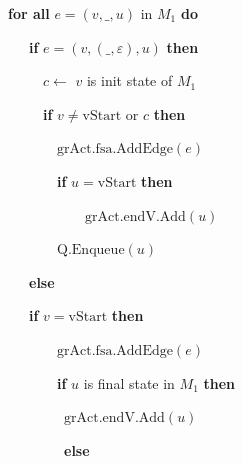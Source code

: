\begin{figure}[b]
\ \ \ \ \ \ \ \ \textbf{for all} {$e = (v, \_, u)$ in $M_1$ \textbf{do}}





\ \ \ \ \ \ \ \ \ \ \ \textbf{if} {$e = (v, (\_, \varepsilon), u)$} \textbf{then}





\ \ \ \ \ \ \ \ \ \ \ \ \ {$c \gets$  $v$ is init state of $M_1$}





\ \ \ \ \ \ \ \ \ \ \ \ \ \textbf{if} {$v \neq \mathrm{vStart}$ or $c$} \textbf{then}





\ \ \ \ \ \ \ \ \ \ \ \ \ \ \ {$\mathrm{grAct.fsa.AddEdge}(e)$}





\ \ \ \ \ \ \ \ \ \ \ \ \ \ \ \textbf{if} {$u = \mathrm{vStart}$} \textbf{then}





\ \ \ \ \ \ \ \ \ \ \ \ \ \ \ \ \ \ \ {$\mathrm{grAct.endV.Add}(u)$}





\ \ \ \ \ \ \ \ \ \ \ \ \ \ \ {$\mathrm{Q.Enqueue}(u)$}







\ \ \ \ \ \ \ \ \ \ \ \textbf{else}





\ \ \ \ \ \ \ \ \ \ \ \textbf{if} {$v = \mathrm{vStart}$} \textbf{then}





\ \ \ \ \ \ \ \ \ \ \ \ \ \ \  {$\mathrm{grAct.fsa.AddEdge}(e)$}





\ \ \ \ \ \ \ \ \ \ \ \ \ \ \ \textbf{if} {$u$ is final state in $M_1$} \textbf{then}





\ \ \ \ \ \ \ \ \ \ \ \ \ \ \ \ {$\mathrm{grAct.endV.Add}(u)$}





\ \ \ \ \ \ \ \ \ \ \ \ \ \ \ \ \textbf{else}






\end{figure}
